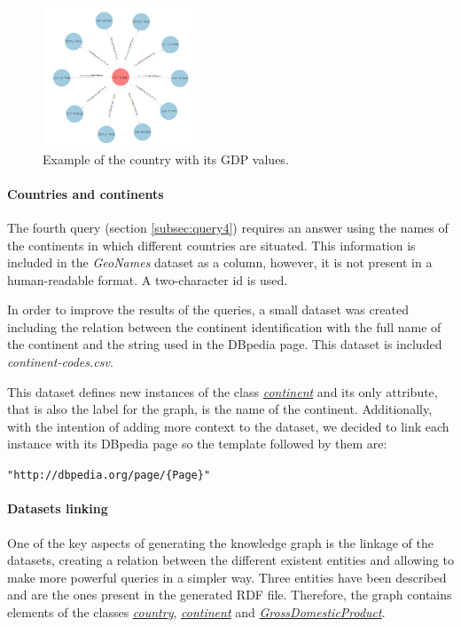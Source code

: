 \documentclass[11pt]{article}
\begin{document}
\begin{figure}
  \includegraphics[width=0.4\textwidth]{images/graph-country.png}
  \caption{Example of the country with its GDP values.}
  \label{fig:graph_example}
  \vspace{-5mm}
\end{figure}

\paragraph{Countries and continents}
The fourth query (section \ref{subsec:query4}) requires an answer using the names of the continents in which different countries are situated. This information is included in the \textit{GeoNames} dataset as a column, however, it is not present in a human-readable format. A two-character id is used.

In order to improve the results of the queries, a small dataset was created including the relation between the continent identification with the full name of the continent and the string used in the DBpedia page. This dataset is included \textit{continent-codes.csv}.

This dataset defines new instances of the class \href{http://mappings.dbpedia.org/server/ontology/classes/Continent}{\textit{continent}} and its only attribute, that is also the label for the graph, is the name of the continent. Additionally, with the intention of adding more context to the dataset, we decided to link each instance with its DBpedia page so the template followed by them are:

\texttt{"http://dbpedia.org/page/\{Page\}"}

\paragraph{Datasets linking}
One of the key aspects of generating the knowledge graph is the linkage of the datasets, creating a relation between the different existent entities and allowing to make more powerful queries in a simpler way. Three entities have been described and are the ones present in the generated RDF file. Therefore, the graph contains elements of the classes \href{http://mappings.dbpedia.org/server/ontology/classes/Country}{\textit{country}}, \href{http://mappings.dbpedia.org/server/ontology/classes/Continent}{\textit{continent}} and \href{http://mappings.dbpedia.org/server/ontology/classes/GrossDomesticProduct}{\textit{GrossDomesticProduct}}. 
\end{document}
